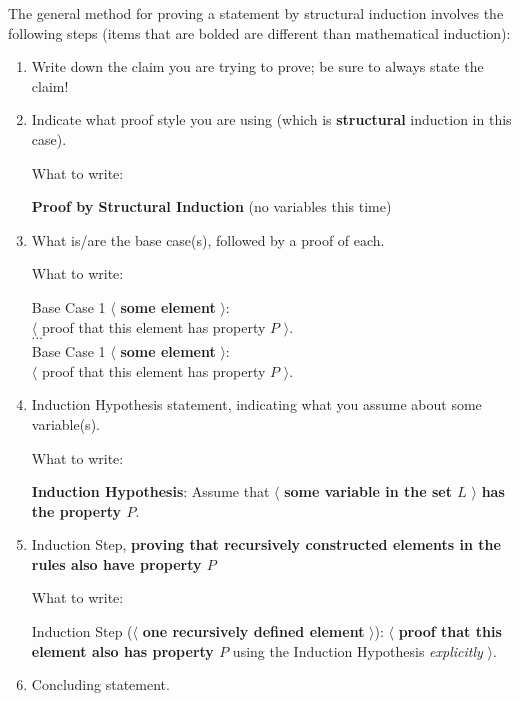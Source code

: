 The general method for proving a statement by structural induction involves the following steps (items that are bolded are different than mathematical induction):
\begin{enumerate}
	\item Write down the claim you are trying to prove; be sure to always state the claim!
	
	\item Indicate what proof style you are using (which is \textbf{structural} induction in this case).
	
	What to write: 
	\begin{mdframed}[align=center]
		\textbf{Proof by Structural Induction} (no variables this time)
	\end{mdframed}
	
	\item What is/are the base case(s), followed by a proof of each. 
	
	What to write: 
	\begin{mdframed}[align=center]
		Base Case 1 $\langle$ \textbf{some element} $\rangle$:\\ $\langle$ proof that this element has property $P$ $\rangle$.\\
		$\cdots$\\
		Base Case 1 $\langle$ \textbf{some element} $\rangle$:\\ $\langle$ proof that this element has property $P$ $\rangle$.\\
	\end{mdframed}
	
	\item Induction Hypothesis statement, indicating what you assume about some variable(s).
	
	What to write:
	\begin{mdframed}[align=center]
		\textbf{Induction Hypothesis}: Assume that $\langle$ \textbf{some variable in the set $L$} $\rangle$ \textbf{has the property $P$}.
	\end{mdframed}
	
	\item Induction Step, \textbf{proving that recursively constructed elements in the rules also have property $P$}
	
	What to write:
	\begin{mdframed}[align=center]
		Induction Step ($\langle$ \textbf{one recursively defined element} $\rangle$): $\langle$ \textbf{proof that this element also has property $P$} using the Induction Hypothesis \emph{explicitly} $\rangle$.
	\end{mdframed}
	
	\item Concluding statement.
	
\end{enumerate}

